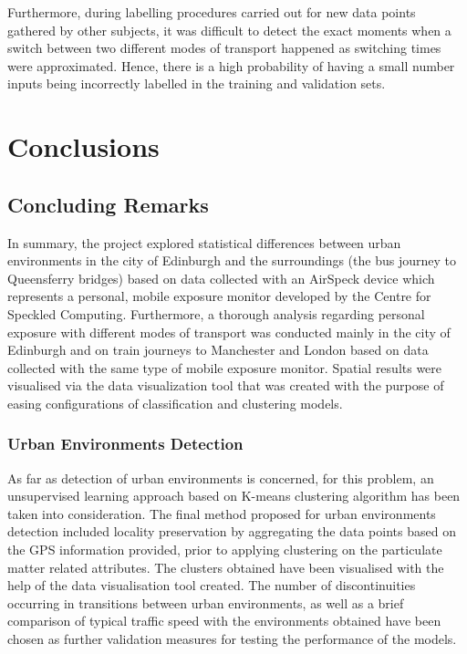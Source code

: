 \documentclass[bsc,frontabs,twoside,singlespacing, parskip,deptreport]{infthesis}     %
\begin{document}
Furthermore, during labelling procedures carried out for new data points gathered by other subjects, it was difficult to detect the exact moments when a switch between two different modes of transport happened as switching times were approximated. Hence, there is a high probability of having a small number inputs being incorrectly labelled in the training and validation sets.



\chapter{Conclusions}

\section{Concluding Remarks}

In summary, the project explored statistical differences between urban environments in the city of Edinburgh and the surroundings (the bus journey to Queensferry bridges) based on data collected with an AirSpeck device which represents a personal, mobile exposure monitor developed by the Centre for Speckled Computing. Furthermore, a thorough analysis regarding personal exposure with different modes of transport was conducted mainly in the city of Edinburgh and on train journeys to Manchester and London based on data collected with the same type of mobile exposure monitor. Spatial results were visualised via the data visualization tool that was created with the purpose of easing configurations of classification and clustering models.

\subsection{Urban Environments Detection}

As far as detection of urban environments is concerned, for this problem, an unsupervised learning approach based on K-means clustering algorithm has been taken into consideration. The final method proposed for urban environments detection included locality preservation by aggregating the data points based on the GPS information provided, prior to applying clustering on the particulate matter related attributes. The clusters obtained have been visualised with the help of the data visualisation tool created. The number of discontinuities occurring in transitions between urban environments, as well as a brief comparison of typical traffic speed with the environments obtained have been chosen as further validation measures for testing the performance of the models.
\end{document}

